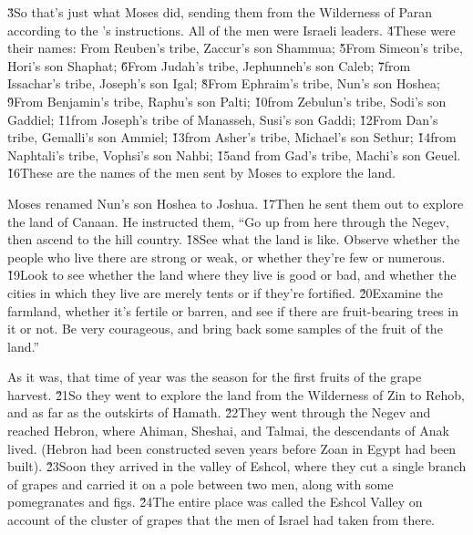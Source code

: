 \v{3}So that's just what Moses did, sending them from the Wilderness of Paran according to the 's instructions. All of the men were Israeli leaders. \v{4}These were their names: From Reuben's tribe, Zaccur's son Shammua; \v{5}From Simeon's tribe, Hori's son Shaphat; \v{6}From Judah's tribe, Jephunneh's son Caleb; \v{7}from Issachar's tribe, Joseph's son Igal; \v{8}From Ephraim's tribe, Nun's son Hoshea; \v{9}From Benjamin's tribe, Raphu's son Palti; \v{10}from Zebulun's tribe, Sodi's son Gaddiel; \v{11}from Joseph's tribe of Manasseh, Susi's son Gaddi; \v{12}From Dan's tribe, Gemalli's son Ammiel; \v{13}from Asher's tribe, Michael's son Sethur; \v{14}from Naphtali's tribe, Vophsi's son Nahbi; \v{15}and from Gad's tribe, Machi's son Geuel. \v{16}These are the names of the men sent by Moses to explore the land.

Moses renamed Nun's son Hoshea to Joshua. \v{17}Then he sent them out to explore the land of Canaan. He instructed them, ``Go up from here through the Negev, then ascend to the hill country. \v{18}See what the land is like. Observe whether the people who live there are strong or weak, or whether they're few or numerous. \v{19}Look to see whether the land where they live is good or bad, and whether the cities in which they live are merely tents or if they're fortified. \v{20}Examine the farmland, whether it's fertile or barren, and see if there are fruit-bearing trees in it or not. Be very courageous, and bring back some samples of the fruit of the land.''

As it was, that time of year was the season for the first fruits of the grape harvest. \v{21}So they went to explore the land from the Wilderness of Zin to Rehob, and as far as the outskirts of Hamath. \v{22}They went through the Negev and reached Hebron, where Ahiman, Sheshai, and Talmai, the descendants of Anak lived. (Hebron had been constructed seven years before Zoan in Egypt had been built). \v{23}Soon they arrived in the valley of Eshcol, where they cut a single branch of grapes and carried it on a pole between two men, along with some pomegranates and figs. \v{24}The entire place was called the Eshcol Valley on account of the cluster of grapes that the men of Israel had taken from there.

